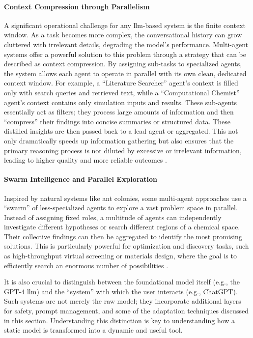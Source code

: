 \paragraph{Context Compression through Parallelism}
A significant operational challenge for any \gls{llm}-based system is the finite context window. 
As a task becomes more complex, the conversational history can grow cluttered with irrelevant details, degrading the model's performance.\autocite{chirkova2025provence0, lee2024long1context} 
Multi-agent systems offer a powerful solution to this problem through a strategy that can be described as context compression. 
By assigning sub-tasks to specialized agents, the system allows each agent to operate in parallel with its own clean, dedicated context window. 
For example, a \enquote{Literature Searcher} agent's context is filled only with search queries and retrieved text, while a \enquote{Computational Chemist} agent's context contains only simulation inputs and results. 
These sub-agents essentially act as filters; they process large amounts of information and then \enquote{compress} their findings into concise summaries or structured data. 
These distilled insights are then passed back to a lead agent or aggregated. 
This not only dramatically speeds up information gathering but also ensures that the primary reasoning process is not diluted by excessive or irrelevant information, leading to higher quality and more reliable outcomes \autocite{Breunig2025HowToFixYourContext}.


\paragraph{Swarm Intelligence and Parallel Exploration}
Inspired by natural systems like ant colonies, some multi-agent approaches use a \enquote{swarm} of less-specialized agents to explore a vast problem space in parallel. Instead of assigning fixed roles, a multitude of agents can independently investigate different hypotheses or search different regions of a chemical space. Their collective findings can then be aggregated to identify the most promising solutions. This is particularly powerful for optimization and discovery tasks, such as high-throughput virtual screening or materials design, where the goal is to efficiently search an enormous number of possibilities \autocite{chen2023agentversefacilitatingmultiagentcollaboration}.


It is also crucial to distinguish between the foundational model itself (e.g., the GPT-4 \gls{llm}) and the \enquote{system} with which the user interacts (e.g., ChatGPT). 
Such systems are not merely the raw model; they incorporate additional layers for safety, prompt management, and some of the adaptation techniques discussed in this section. Understanding this distinction is key to understanding how a static model is transformed into a dynamic and useful tool.
